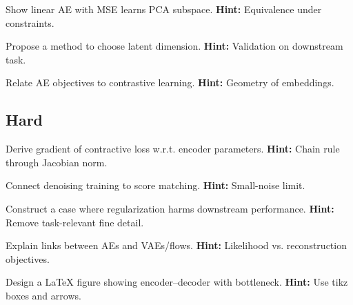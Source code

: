 \begin{problem}[Linear AE]
Show linear AE with MSE learns PCA subspace.
\textbf{Hint:} Equivalence under constraints.
\end{problem}

\begin{problem}
Propose a method to choose latent dimension.
\textbf{Hint:} Validation on downstream task.
\end{problem}

\begin{problem}
Relate AE objectives to contrastive learning.
\textbf{Hint:} Geometry of embeddings.
\end{problem}

\subsection*{Hard}
\begin{problem}
Derive gradient of contractive loss w.r.t. encoder parameters.
\textbf{Hint:} Chain rule through Jacobian norm.
\end{problem}

\begin{problem}
Connect denoising training to score matching.
\textbf{Hint:} Small-noise limit.
\end{problem}

\begin{problem}
Construct a case where regularization harms downstream performance.
\textbf{Hint:} Remove task-relevant fine detail.
\end{problem}

\begin{problem}
Explain links between AEs and VAEs/flows.
\textbf{Hint:} Likelihood vs. reconstruction objectives.
\end{problem}

\begin{problem}[Visualization]
Design a LaTeX figure showing encoder–decoder with bottleneck.
\textbf{Hint:} Use tikz boxes and arrows.
\end{problem}


